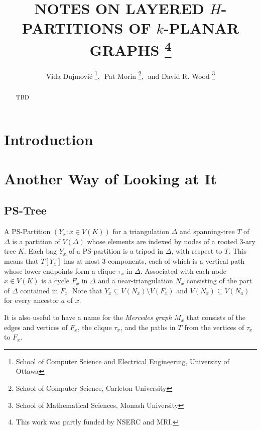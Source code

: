 \documentclass{patmorin}
\title{\MakeUppercase{Notes on Layered $H$-Partitions of $k$-Planar Graphs}%
    \thanks{This work was partly funded by NSERC and MRI.}}
\author{Vida Dujmovi\'c%
        \thanks{School of Computer Science and Electrical Engineering, 
                University of Ottawa},\,\, 
        Pat Morin%
        \thanks{School of Computer Science, Carleton University},\,\, and
        David R. Wood%
        \thanks{School of Mathematical Sciences, Monash University}}
\begin{document}
\maketitle


\begin{abstract}
  TBD
\end{abstract}

\section{Introduction}



\section{Another Way of Looking at It}

\subsection{PS-Tree}

A PS-Partition $(Y_x:x\in V(K))$ for a triangulation $\Delta$ and spanning-tree $T$ of $\Delta$ is a partition of $V(\Delta)$ whose elements are indexed by nodes of a rooted 3-ary tree $K$.  Each bag $Y_x$ of a PS-partition is a tripod in $\Delta$, with respect to $T$.  This means that $T[Y_x]$ has at most 3 components, each of which is a vertical path whose lower endpoints form a clique $\tau_x$ in $\Delta$.  Associated with each node $x\in V(K)$ is a cycle $F_x$ in $\Delta$ and a near-triangulation $N_x$ consisting of the part of $\Delta$ contained in $F_x$.  Note that $Y_x\subseteq V(N_x)\setminus V(F_x)$ and $V(N_x)\subseteq V(N_a)$ for every ancestor $a$ of $x$.

It is also useful to have a name for the \emph{Mercedes graph} $M_x$ that consists of the edges and vertices of $F_x$, the clique $\tau_x$, and the paths in $T$ from the vertices of $\tau_x$ to $F_x$.
\end{document}
